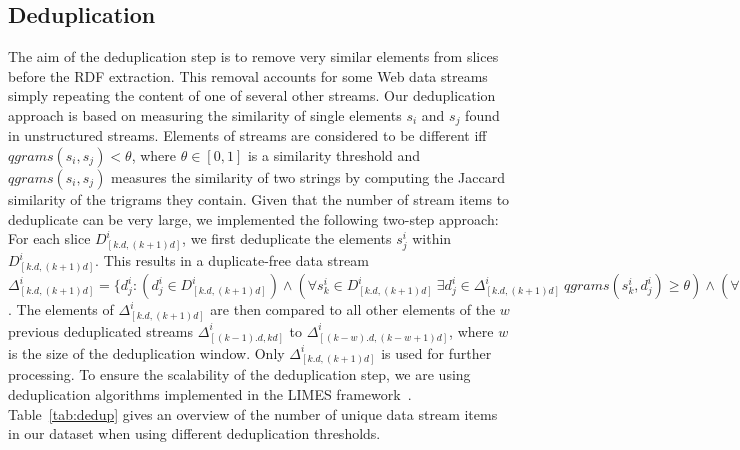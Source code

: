 \documentclass[a4paper]{llncs}
\begin{document}
\subsection{Deduplication}
\label{subsec:deduplication}
The aim of the deduplication step is to remove very similar elements from slices before the RDF extraction.
This removal accounts for some Web data streams simply repeating the content of one of several other streams.
Our deduplication approach is based on measuring the similarity of single elements $s_i$ and $s_j$ found in unstructured streams.
Elements of streams are considered to be different iff $qgrams(s_i, s_j) < \theta$, where $\theta \in [0, 1]$ is a similarity threshold and $qgrams(s_i, s_j)$ measures the similarity of two strings by computing the Jaccard similarity of the trigrams they contain.
Given that the number of stream items to deduplicate can be very large, we implemented the following two-step approach:
For each slice $D^i_{[k.d, (k+1)d]}$, we first deduplicate the elements $s^i_j$ within $D^i_{[k.d, (k+1)d]}$.
This results in a duplicate-free data stream $\Delta^i_{[k.d, (k+1)d]} = \{d^i_j:  (d^i_j \in D^i_{[k.d, (k+1)d]}) \wedge (\forall s^i_k \in D^i_{[k.d, (k+1)d]}\ \exists d^i_j \in \Delta^i_{[k.d, (k+1)d]}\ qgrams(s^i_k, d^i_j) \geq \theta) \wedge (\forall d^i_j, d^i_k \in \Delta^i_{[k.d, (k+1)d]}\ qgrams(d^i_k, d^i_j) < \theta)\}$.
The elements of $\Delta^i_{[k.d, (k+1)d]}$ are then compared to all other elements of the $w$ previous deduplicated streams $\Delta^i_{[(k-1).d, kd]}$ to $\Delta^i_{[(k-w).d, (k-w+1)d]}$, where $w$ is the size of the deduplication window.
Only $\Delta^i_{[k.d, (k+1)d]}$ is used for further processing.
To ensure the scalability of the deduplication step, we are using deduplication algorithms implemented in the LIMES framework~\cite{DBLP:journals/jodsn/Ngomo12}.
Table~\ref{tab:dedup} gives an overview of the number of unique data stream items in our dataset when using different deduplication thresholds.
\end{document}
